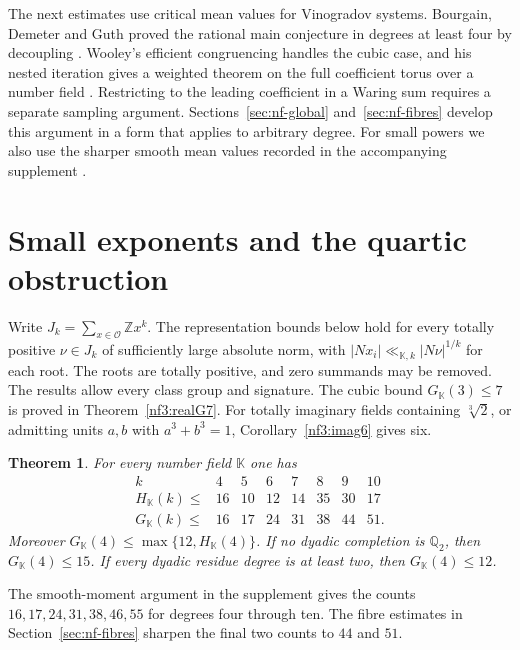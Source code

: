\documentclass[11pt,letterpaper]{article}
\newtheorem{theorem}{Theorem}[section]
\theoremstyle{definition}
\numberwithin{equation}{section}
\begin{document}
The next estimates use critical mean values for Vinogradov systems.
Bourgain, Demeter and Guth proved the rational main conjecture in
degrees at least four by decoupling \cite{NFBDG}. Wooley's
efficient congruencing handles the cubic case, and his nested
iteration gives a weighted theorem on the full coefficient torus
over a number field \cite{NFWooley}. Restricting to the leading
coefficient in a Waring sum requires a separate sampling argument.
Sections~\ref{sec:nf-global} and~\ref{sec:nf-fibres} develop this
argument in a form that applies to arbitrary degree. For small powers
we also use the sharper smooth mean values recorded in
the accompanying supplement \cite{NFSmallSupplement}.

\section{Small exponents and the quartic obstruction}
\label{sec:nf-small-powers}

Write $J_k=\sum_{x\in\mathcal O}\mathbb Zx^k$. The representation
bounds below hold for every totally positive $\nu\in J_k$ of
sufficiently large absolute norm, with
$|N x_i|\ll_{\mathbb K,k}|N\nu|^{1/k}$ for each root. The roots are
totally positive, and zero summands may be removed. The results allow
every class group and signature. The cubic bound
$G_{\mathbb K}(3)\le7$ is proved in Theorem~\ref{nf3:realG7}.
For totally imaginary fields containing $\sqrt[3]{2}$, or admitting
units $a,b$ with $a^3+b^3=1$, Corollary~\ref{nf3:imag6} gives six.

\begin{theorem}\label{thm:nf-small}
For every number field $\mathbb K$ one has
\[
\begin{array}{c|rrrrrrr}
k&4&5&6&7&8&9&10\\\hline
H_{\mathbb K}(k)\le&16&10&12&14&35&30&17\\
G_{\mathbb K}(k)\le&16&17&24&31&38&44&51 .
\end{array}
\]
Moreover $G_{\mathbb K}(4)\le\max\{12,H_{\mathbb K}(4)\}$.
If no dyadic completion is $\mathbb Q_2$, then $G_{\mathbb K}(4)\le15$.
If every dyadic residue degree is at least two, then $G_{\mathbb K}(4)\le12$.
\end{theorem}

The smooth-moment argument in the supplement gives the counts
$16,17,24,31,38,46,55$ for degrees four through ten. The fibre
estimates in Section~\ref{sec:nf-fibres} sharpen the final two
counts to $44$ and $51$.
\end{document}
